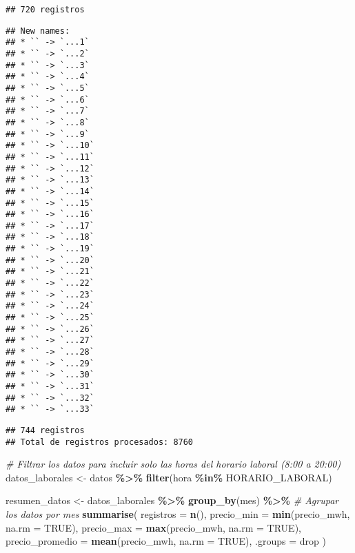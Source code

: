 \documentclass[
]{article}
\newenvironment{Shaded}{\begin{snugshade}}{\end{snugshade}}
\newcommand{\AttributeTok}[1]{\textcolor[rgb]{0.13,0.29,0.53}{#1}}
\newcommand{\CommentTok}[1]{\textcolor[rgb]{0.56,0.35,0.01}{\textit{#1}}}
\newcommand{\ConstantTok}[1]{\textcolor[rgb]{0.56,0.35,0.01}{#1}}
\newcommand{\FunctionTok}[1]{\textcolor[rgb]{0.13,0.29,0.53}{\textbf{#1}}}
\newcommand{\NormalTok}[1]{#1}
\newcommand{\OtherTok}[1]{\textcolor[rgb]{0.56,0.35,0.01}{#1}}
\newcommand{\SpecialCharTok}[1]{\textcolor[rgb]{0.81,0.36,0.00}{\textbf{#1}}}
\newcommand{\StringTok}[1]{\textcolor[rgb]{0.31,0.60,0.02}{#1}}
\begin{document}
\begin{verbatim}
## 720 registros
\end{verbatim}

\begin{verbatim}
## New names:
## * `` -> `...1`
## * `` -> `...2`
## * `` -> `...3`
## * `` -> `...4`
## * `` -> `...5`
## * `` -> `...6`
## * `` -> `...7`
## * `` -> `...8`
## * `` -> `...9`
## * `` -> `...10`
## * `` -> `...11`
## * `` -> `...12`
## * `` -> `...13`
## * `` -> `...14`
## * `` -> `...15`
## * `` -> `...16`
## * `` -> `...17`
## * `` -> `...18`
## * `` -> `...19`
## * `` -> `...20`
## * `` -> `...21`
## * `` -> `...22`
## * `` -> `...23`
## * `` -> `...24`
## * `` -> `...25`
## * `` -> `...26`
## * `` -> `...27`
## * `` -> `...28`
## * `` -> `...29`
## * `` -> `...30`
## * `` -> `...31`
## * `` -> `...32`
## * `` -> `...33`
\end{verbatim}

\begin{verbatim}
## 744 registros
## Total de registros procesados: 8760
\end{verbatim}

\begin{Shaded}
\begin{Highlighting}[]
\CommentTok{\# Filtrar los datos para incluir solo las horas del horario laboral (8:00 a 20:00)}
\NormalTok{datos\_laborales }\OtherTok{\textless{}{-}}\NormalTok{ datos }\SpecialCharTok{\%\textgreater{}\%}
  \FunctionTok{filter}\NormalTok{(hora }\SpecialCharTok{\%in\%}\NormalTok{ HORARIO\_LABORAL)}

\NormalTok{resumen\_datos }\OtherTok{\textless{}{-}}\NormalTok{ datos\_laborales }\SpecialCharTok{\%\textgreater{}\%}
  \FunctionTok{group\_by}\NormalTok{(mes) }\SpecialCharTok{\%\textgreater{}\%}  \CommentTok{\# Agrupar los datos por mes}
  \FunctionTok{summarise}\NormalTok{(}
    \AttributeTok{registros =} \FunctionTok{n}\NormalTok{(),  }
    \AttributeTok{precio\_min =} \FunctionTok{min}\NormalTok{(precio\_mwh, }\AttributeTok{na.rm =} \ConstantTok{TRUE}\NormalTok{),      }
    \AttributeTok{precio\_max =} \FunctionTok{max}\NormalTok{(precio\_mwh, }\AttributeTok{na.rm =} \ConstantTok{TRUE}\NormalTok{),      }
    \AttributeTok{precio\_promedio =} \FunctionTok{mean}\NormalTok{(precio\_mwh, }\AttributeTok{na.rm =} \ConstantTok{TRUE}\NormalTok{), }
    \AttributeTok{.groups =} \StringTok{\textquotesingle{}drop\textquotesingle{}}
\NormalTok{  )}
\end{Highlighting}
\end{Shaded}
\end{document}
